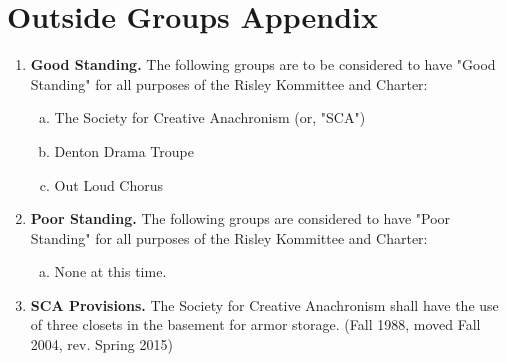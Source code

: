 \documentclass[12pt]{article}
\begin{document}
\section*{Outside Groups Appendix}
\begin{enumerate}[1.]
\item \textbf{Good Standing.} The following groups are to be considered to have "Good Standing" for all purposes of the Risley Kommittee and Charter: 
\begin{enumerate}[a.]
\item The Society for Creative Anachronism (or, "SCA") 
\item Denton Drama Troupe
\item Out Loud Chorus
\end{enumerate}
\item \textbf{Poor Standing.} The following groups are considered to have "Poor Standing" for all purposes of the Risley Kommittee and Charter: 
\begin{enumerate}[a.]
\item None at this time.
\end{enumerate}
\item \textbf{SCA Provisions.} The Society for Creative Anachronism shall have the use of three closets in the basement for armor storage. (Fall 1988, moved Fall 2004, rev. Spring 2015)
\end{enumerate}
\end{document}
